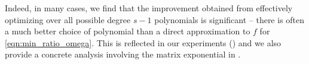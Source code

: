 Indeed, in many cases, we find that the improvement obtained from effectively optimizing over all possible degree $s-1$ polynomials is significant -- there is often a much better choice of polynomial than a direct approximation to $f$ for \cref{eqn:min_ratio_omega}. This is reflected in our experiments () and we also provide a concrete analysis involving the matrix exponential in .


